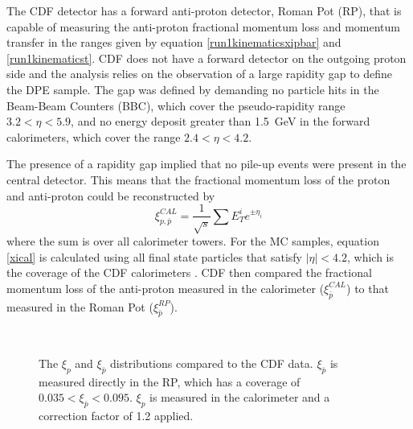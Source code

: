 The CDF detector has a forward anti-proton detector, Roman Pot (RP), that is capable of measuring the anti-proton fractional momentum loss and momentum transfer in the ranges given by equation \ref{run1kinematicsxipbar} and \ref{run1kinematicst}. CDF does not have a forward detector on the outgoing proton side and the analysis relies on the observation of a large rapidity gap to define the DPE sample. The gap was defined by demanding no particle hits in the Beam-Beam Counters (BBC), which cover the pseudo-rapidity range $3.2 < \eta < 5.9$, and no energy deposit  greater than 1.5~GeV in the forward calorimeters, which cover the range $2.4 < \eta < 4.2$.

The presence of a rapidity gap implied that no pile-up events were present in the central detector. This means that the fractional momentum loss of the proton and anti-proton could be reconstructed by
\begin{equation} \label{xical}
\xi_{p,\bar{p}}^{CAL} = \frac{1}{\sqrt{s}} \sum E_T^i e^{\pm \eta_i}
\end{equation}
where the sum is over all calorimeter towers. For the MC samples, equation \ref{xical} is calculated using all final state particles that satisfy $|\eta|<4.2$, which is the coverage of the CDF calorimeters \cite{Blair:1996kx}. CDF then compared the fractional momentum loss of the anti-proton measured in the calorimeter ($\xi_{\bar{p}}^{CAL}$) to that measured in the Roman Pot ($\xi_{\bar{p}}^{RP}$). 

\begin{figure}[t]
\centering
	\mbox{
	}
\caption[The event generator $\xi_p$ and $\xi_{\bar{p}}$ distributions compared to CDF data]{The $\xi_p$ and $\xi_{\bar{p}}$ distributions compared to the CDF data. $\xi_{\bar{p}}$ is measured directly in the RP, which has a coverage of $0.035 < \xi_{\bar{p}} < 0.095$. $\xi_p$ is measured in the calorimeter and a correction factor of 1.2 applied. \label{cdfmomentumloss}}
\end{figure}

